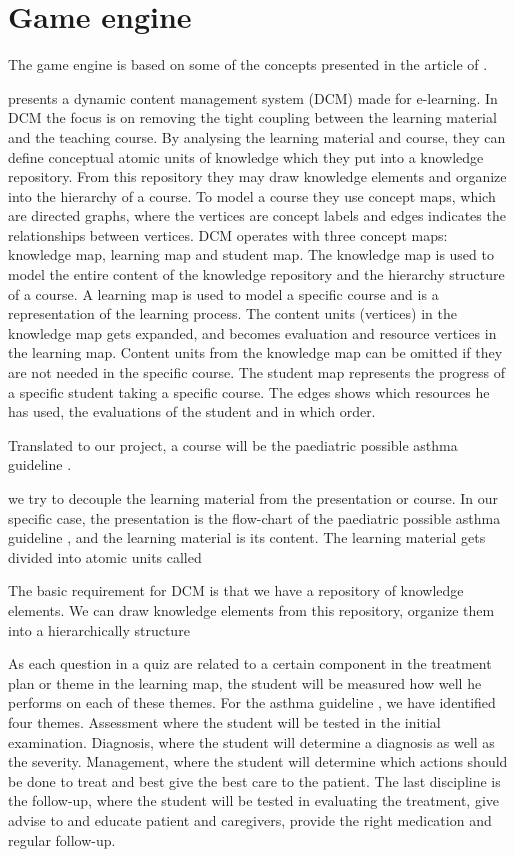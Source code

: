 \section{Game engine}
The game engine is based on some of the concepts presented in the article of \textcite{Eide2008}.

\textcite{Eide2008} presents a dynamic content management system (DCM) made for e-learning. In DCM the focus is on removing the tight coupling between the learning material and the teaching course. By analysing the learning material and course, they can define conceptual atomic units of knowledge which they put into a knowledge repository. From this repository they may draw knowledge elements and organize into the hierarchy of a course. To model a course they use concept maps, which are directed graphs, where the vertices are concept labels and edges indicates the relationships between vertices. DCM operates with three concept maps: knowledge map, learning map and student map. The knowledge map is used to model the entire content of the knowledge repository and the hierarchy structure of a course. A learning map is used to model a specific course and is a representation of the learning process. The content units (vertices) in the knowledge map gets expanded, and becomes evaluation and resource vertices in the learning map. Content units from the knowledge map can be omitted if they are not needed in the specific course. The student map represents the progress of a specific student taking a specific course. The edges shows which resources he has used, the evaluations of the student and in which order. 

Translated to our project, a course will be the paediatric possible asthma guideline \parencite{RepublicofKeny2016}. 

 we try to decouple the learning material from the presentation or course. In our specific case, the presentation is the flow-chart of the paediatric possible asthma guideline \parencite{RepublicofKeny2016}, and the learning material is its content. The learning material gets divided into atomic units called 

The basic requirement for DCM is that we have a repository of knowledge elements. We can draw knowledge elements from this repository, organize them into a hierarchically structure 


As each question in a quiz are related to a certain component in the treatment plan or theme in the learning map, the student will be measured how well he performs on each of these themes. For the asthma guideline \parencite{RepublicofKeny2016}, we have identified four themes. Assessment where the student will be tested in the initial examination. Diagnosis, where the student will determine a diagnosis as well as the severity. Management, where the student will determine which actions should be done to treat and best give the best care to the patient. The last discipline is the follow-up, where the student will be tested in evaluating the treatment, give advise to and educate patient and caregivers, provide the right medication and regular follow-up.

